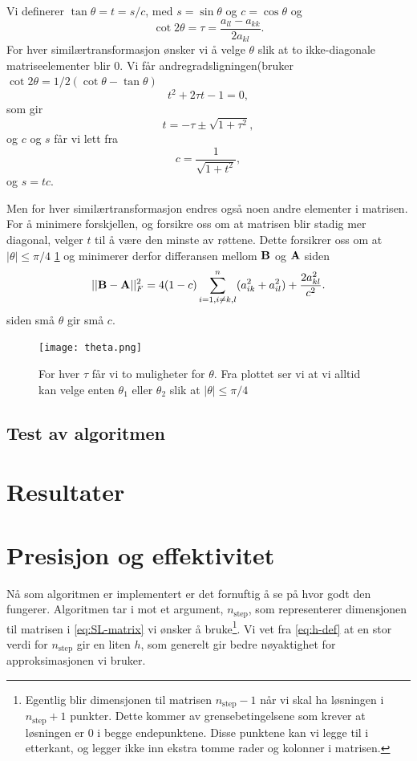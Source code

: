 \documentclass[11pt]{article}
\begin{document}
Vi definerer $\tan\theta = t= s/c$, med $s=\sin\theta$ og $c=\cos\theta$ og
\[\cot 2\theta=\tau = \frac{a_{ll}-a_{kk}}{2a_{kl}}.
\]
For hver similærtransformasjon ønsker vi å velge $\theta$ slik at to ikke-diagonale matriseelementer blir 0. 
 Vi får andregradsligningen(bruker $\cot 2\theta=1/2(\cot \theta-\tan\theta)$
\[
t^2+2\tau t-1= 0,
\]
som gir 
\[
  t = -\tau \pm \sqrt{1+\tau^2},
\]
og $c$ og $s$ får vi lett fra
\[
   c = \frac{1}{\sqrt{1+t^2}},
\]
og $s=tc$. 

Men for hver similærtransformasjon endres også noen andre elementer i matrisen. For 
å minimere forskjellen, og forsikre oss om at matrisen blir stadig mer diagonal, 
velger $t$ til å være den minste av røttene. Dette forsikrer oss om at $|\theta| \le \pi/4$ \ref{fig:theta} og minimerer derfor differansen mellom ${\bf B}$ og ${\bf A}$ siden
\[
||{\bf B}-{\bf A}||_F^2=4(1-c)\sum_{i=1,i\ne k,l}^n(a_{ik}^2+a_{il}^2) +\frac{2a_{kl}^2}{c^2}.
\]
siden små $\theta$ gir små $c$.

\begin{figure}[ht]
  \centering
  \texttt{[image: theta.png]}
  \caption{\label{fig:theta} For hver $\tau$ får vi to muligheter for $\theta$. Fra plottet ser vi at vi alltid kan velge enten $\theta_1$ eller $\theta_2$ slik at $|\theta| \le \pi/4$ }
\end{figure}

\subsection{Test av algoritmen}

\section{Resultater}











\section{Presisjon og effektivitet}
Nå som algoritmen er implementert er det fornuftig å se på hvor godt
den fungerer. Algoritmen tar i mot et argument, $n_{\text{step}}$, som
representerer dimensjonen til matrisen i \eqref{eq:SL-matrix} vi
ønsker å bruke\footnote{Egentlig blir dimensjonen til matrisen
  $n_\text{step}-1$ når vi skal ha løsningen i $n_\text{step}+1$
  punkter. Dette kommer av grensebetingelsene som krever at løsningen
  er 0 i begge endepunktene. Disse punktene kan vi legge til i
  etterkant, og legger ikke inn ekstra tomme rader og kolonner i
  matrisen.}. Vi vet fra \eqref{eq:h-def} at en stor verdi for
$n_\text{step}$ gir en liten $h$, som generelt gir bedre nøyaktighet
for approksimasjonen vi bruker.  
\end{document}
